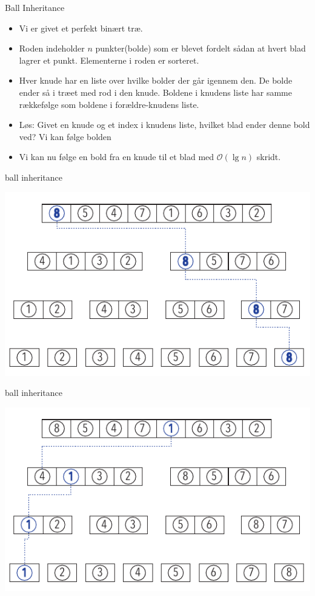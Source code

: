 \documentclass[pdf]{beamer}
\begin{document}
\begin{frame}{Ball Inheritance}

  \begin{itemize}
    \item Vi er givet et perfekt binært træ.
      \pause
    \item Roden indeholder $n$ punkter(bolde) som er blevet fordelt sådan at hvert blad lagrer et punkt. Elementerne i roden er sorteret.
      \pause
    \item Hver knude har en liste over hvilke bolder der går igennem den. De bolde ender så i træet med rod i den knude. Boldene i knudens liste har samme rækkefølge som boldene i forældre-knudens liste.
     \pause
    \item Løs: Givet en knude og et index i knudens liste, hvilket blad ender denne bold ved? Vi kan følge bolden 
     \pause
    \item Vi kan nu følge en bold fra en knude til et blad med $\mathcal{O}(\lg n)$ skridt.

  \end{itemize}
\end{frame}


\begin{frame}{ball inheritance}
  \begin{center}
    \includegraphics[scale=1.0]{pictures/bolde_8.pdf}
  \end{center}
\end{frame}


\begin{frame}{ball inheritance}
  \begin{center}
    \includegraphics[scale=1.0]{pictures/bolde_1.pdf}
  \end{center}
\end{frame}
\end{document}
